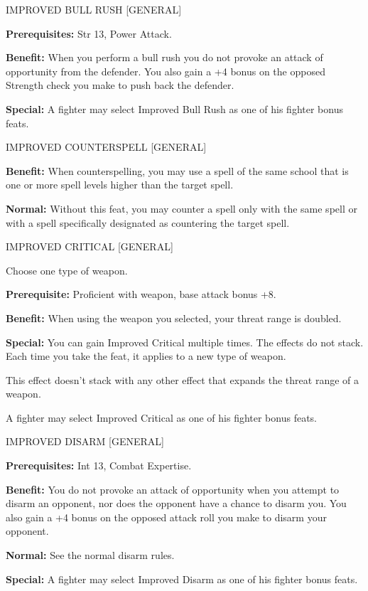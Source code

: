 \documentclass{article}
\begin{document}
\vspace{12pt}
IMPROVED BULL RUSH [GENERAL]

\textbf{Prerequisites:} Str 13, Power Attack.

\textbf{Benefit:} When you perform a bull rush you do not provoke an attack of 
opportunity from the defender. You also gain a +4 bonus on the opposed Strength 
check you make to push back the defender.

\textbf{Special:} A fighter may select Improved Bull Rush as one of his fighter 
bonus feats.

\vspace{12pt}
IMPROVED COUNTERSPELL [GENERAL]

\textbf{Benefit: }When counterspelling, you may use a spell of the same school 
that is one or more spell levels higher than the target spell.

\textbf{Normal:} Without this feat, you may counter a spell only with the same 
spell or with a spell specifically designated as countering the target spell.

\vspace{12pt}
IMPROVED CRITICAL [GENERAL]

Choose one type of weapon.

\textbf{Prerequisite:} Proficient with weapon, base attack bonus +8.

\textbf{Benefit:} When using the weapon you selected, your threat range is doubled.

\textbf{Special:} You can gain Improved Critical multiple times. The effects do 
not stack. Each time you take the feat, it applies to a new type of weapon.

This effect doesn't stack with any other effect that expands the threat range of 
a weapon.

A fighter may select Improved Critical as one of his fighter bonus feats.

\vspace{12pt}
IMPROVED DISARM [GENERAL]

\textbf{Prerequisites:} Int 13, Combat Expertise.

\textbf{Benefit:} You do not provoke an attack of opportunity when you attempt 
to disarm an opponent, nor does the opponent have a chance to disarm you. You also 
gain a +4 bonus on the opposed attack roll you make to disarm your opponent.

\textbf{Normal:} See the normal disarm rules.

\textbf{Special:} A fighter may select Improved Disarm as one of his fighter bonus 
feats.
\end{document}
